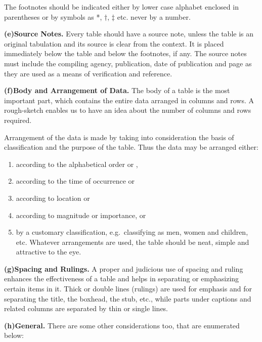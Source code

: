 \documentclass[]{article}
\providecommand{\tightlist}{%
  \setlength{\itemsep}{0pt}\setlength{\parskip}{0pt}}
\begin{document}
The footnotes should be indicated either by lower case alphabet enclosed
in parentheses or by symbols as *, \(\dagger\), \(\ddagger\) etc. never
by a number.

\textbf{(e)Source Notes.} Every table should have a source note, unless
the table is an original tabulation and its source is clear from the
context. It is placed immediately below the table and below the
footnotes, if any. The source notes must include the compiling agency,
publication, date of publication and page as they are used as a means of
verification and reference.

\textbf{(f)Body and Arrangement of Data.} The body of a table is the
most important part, which contains the entire data arranged in columns
and rows. A rough-sketch enables us to have an idea about the number of
columns and rows required.

Arrangement of the data is made by taking into consideration the basis
of classification and the purpose of the table. Thus the data may be
arranged either:

\begin{enumerate}
\def\labelenumi{(\roman{enumi})}
\tightlist
\item
  according to the alphabetical order or ,\\
\item
  according to the time of occurrence or\\
\item
  according to location or\\
\item
  according to magnitude or importance, or\\
\item
  by a customary classification, e.g.~classifying as men, women and
  children, etc. Whatever arrangements are used, the table should be
  neat, simple and attractive to the eye.
\end{enumerate}

\textbf{(g)Spacing and Rulings.} A proper and judicious use of spacing
and ruling enhances the effectiveness of a table and helps in separating
or emphasizing certain items in it. Thick or double lines (rulings) are
used for emphasis and for separating the title, the boxhead, the stub,
etc., while parts under captions and related columns are separated by
thin or single lines.

\textbf{(h)General.} There are some other considerations too, that are
enumerated below:
\end{document}
